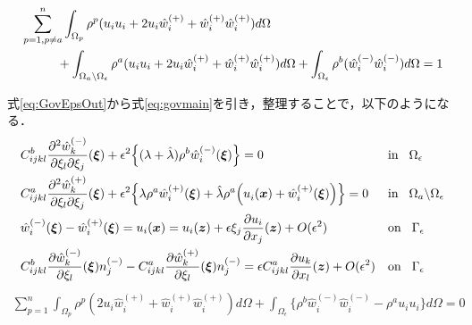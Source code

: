 \begin{align}
	&\sum_{p=1,p\neq a}^{n}\int_{\Omega_p}\rho^{p}(u_{i}u_{i}+2u_{i}\hat{w}_{i}^{(+)}+\hat{w}_{i}^{(+)}\hat{w}_{i}^{(+)}) d\Omega
	\nonumber
	\\
	&\hspace{1.0cm}+\int_{\Omega_a\backslash\Omega_{\epsilon}}\rho^{a}(u_{i}u_{i}+2u_{i}\hat{w}_{i}^{(+)}+\hat{w}_{i}^{(+)}\hat{w}_{i}^{(+)}) d\Omega
	+\int_{\Omega_{\epsilon}}\rho^{b}(\hat{w}_{i}^{(-)}\hat{w}_{i}^{(-)}) d\Omega=1
	\label{eq:GovEpsNorm}
\end{align}

式\eqref{eq:GovEpsOut}から式\eqref{eq:govmain}を引き，整理することで，以下のようになる．
\begin{align}
	&C_{ijkl}^{b} \frac{\partial^2 \hat{w}^{(-)}_{k}} {\partial \xi_l \partial \xi_j}(\bm{\xi})
	+\epsilon^2\Bigl\{(\lambda+\hat{\lambda})\rho^{b} \hat{w}_{i}^{(-)}(\bm{\xi})\Bigr\}=0
	&&\text{in}\hspace{0.3cm}\Omega_{\epsilon}
	\label{eq:GovDisturIn}
	\\
	&C_{ijkl}^{a}\frac{\partial^2 \hat{w}^{(+)}_{k}} {\partial \xi_l \partial \xi_j}(\bm{\xi})
	+\epsilon^2\Bigl \{\lambda\rho^{a} \hat{w}_{i}^{(+)}(\bm{\xi})
	+\hat{\lambda}\rho^{a} \Bigl(u_{i}^{}(\bm{x})+\hat{w}_{i}^{(+)}(\bm{\xi}) \Bigr) \Bigr \}=0
	&&\text{in}\hspace{0.3cm}\Omega_{a}\backslash\Omega_{\epsilon}
	\label{eq:GovDisturOut}
	\\
	&\hat{w}_{i}^{(-)}(\bm{\xi})-\hat{w}_{i}^{(+)}(\bm{\xi})=u_{i}(\bm{x})=u_{i}(\bm{z})+\epsilon \xi_{j} \frac{\partial u_{i}}{\partial x_{j}}(\bm{z})+O(\epsilon^2)
	&&\text{on}\hspace{0.3cm}\Gamma_{\epsilon}
	\label{eq:GovDisturUBC}
	\\
	&C_{ijkl}^{b}\frac{\partial \hat{w}^{(-)}_{k}} {\partial \xi_l}(\bm{\xi})n_{j}^{(-)}
	-C_{ijkl}^{a}\frac{\partial \hat{w}^{(+)}_{k}} {\partial \xi_l}(\bm{\xi})n_{j}^{(-)}
	=\epsilon C_{ijkl}^{a}\frac{\partial u_{k}}{\partial x_{l}}(\bm{z})+O(\epsilon^2)
	&&\text{on}\hspace{0.3cm}\Gamma_{\epsilon}
	\label{eq:GovDisturSBC}
\end{align}
\begin{align}
	\sum_{p=1}^{n}\int_{\Omega_p}\rho^{p}(2u_{i}\hat{w}_{i}^{(+)}+\hat{w}_{i}^{(+)}\hat{w}_{i}^{(+)}) d\Omega
	+\int_{\Omega_{\epsilon}}\{\rho^{b}\hat{w}_{i}^{(-)}\hat{w}_{i}^{(-)}-\rho^{a}u_{i}u_{i}\} d\Omega=0
	\label{eq:GovDisturNorm}
\end{align}

